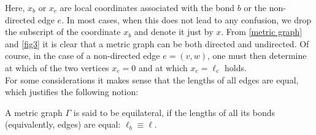 Here, $x_b$ or $x_e$ are local coordinates associated with the bond $b$ or the non-directed edge $e$. In most cases, when this does not lead to any confusion, we drop the subscript of the coordinate $x_b$ and denote it just by $x$. From \cref{metric graph} and \cref{fig3} it is clear that a metric graph can be both directed and undirected. Of course, in the case of a non-directed edge $e = (v, w)$, one must then determine at which of the two vertices $x_e = 0$ and at which $x_e = \ell_e$ holds. \\
For some considerations it makes sense that the lengths of all edges are equal, which justifies the following notion:

\begin{definition}
    \label{metric graph equilateral}
    A metric graph $\Gamma$ is said to be equilateral, if the lengths of all its bonds (equivalently, edges) are equal: $\ell_b \equiv \ell$.
\end{definition}

